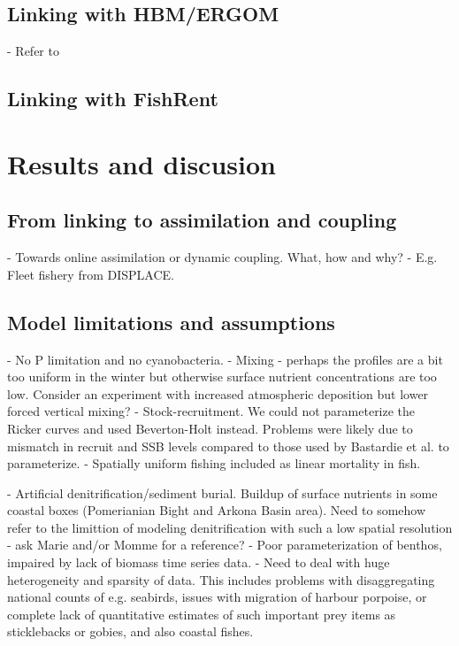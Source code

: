 \documentclass[10pt,letterpaper]{article}
\begin{document}
\subsection{Linking with HBM/ERGOM}
    - Refer to 
\subsection{Linking with FishRent}




\section*{Results and discusion}

\subsection*{From linking to assimilation and coupling}
- Towards online assimilation or dynamic coupling. What, how and why? 
- E.g. Fleet fishery from DISPLACE.

\subsection*{Model limitations and assumptions}
- No P limitation and no cyanobacteria. 
- Mixing - perhaps the profiles are a bit too uniform in the winter but otherwise surface nutrient concentrations are too low. Consider an experiment with increased atmospheric deposition but lower forced vertical mixing?
- Stock-recruitment. We could not parameterize the Ricker curves and used Beverton-Holt instead. Problems were likely due to mismatch in recruit and SSB levels compared to those used by Bastardie et al. to parameterize. 
- Spatially uniform fishing included as linear mortality in fish.

- Artificial denitrification/sediment burial. Buildup of surface nutrients in some coastal boxes (Pomerianian Bight and Arkona Basin area). Need to somehow refer to the limittion of modeling denitrification with such a low spatial resolution - ask Marie and/or Momme for a reference?
- Poor parameterization of benthos, impaired by lack of biomass time series data. 
- Need to deal with huge heterogeneity and sparsity of data. This includes problems with disaggregating national counts of e.g. seabirds, issues with migration of harbour porpoise, or complete lack of quantitative estimates of such important prey items as sticklebacks or gobies, and also coastal fishes. 
\end{document}

